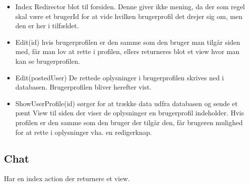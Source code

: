 \begin{itemize}
	\item Index Redirector blot til forsiden. Denne giver ikke mening, da der som regel skal være et brugerId for at vide hvilken brugerprofil det drejer sig om, men den er her i tilfældet.
	\item Edit(id) hvis brugerprofilen er den samme som den bruger man tilgår siden med, får man lov at rette i profilen, ellers returneres blot et view hvor man kan se brugerprofilen.
	\item Edit(postedUser) De rettede oplysninger i brugerprofilen skrives ned i databasen. Brugerprofilen bliver herefter vist.
	\item ShowUserProfile(id) sørger for at trække data udfra databasen og sende et pænt View til siden der viser de oplysninger en brugerprofil indeholder. Hvis profilen er den samme som den bruger der tilgår den, får brugeren mulighed for at rette i oplysninger vha. en redigerknap.
\end{itemize}

\subsection{Chat}

Har en index action der returnere et view.

